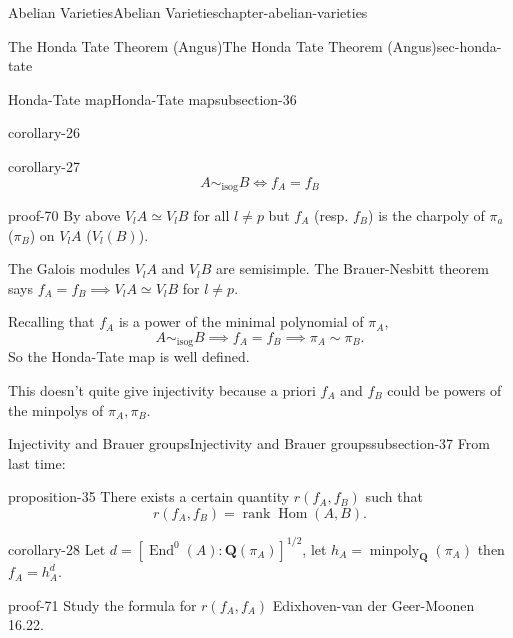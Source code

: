 \documentclass[oneside,10pt,]{book}
\numberwithin{equation}{section}
\newcommand{\lb}{[}
\newcommand{\rb}{]}
\newcommand{\QQ}{\mathbf{Q}}
\DeclareMathOperator{\End}{End}
\DeclareMathOperator{\Hom}{Hom}
\DeclareMathOperator{\rank}{rank}
\begin{document}
\begin{chapterptx}{Abelian Varieties}{}{Abelian Varieties}{}{}{chapter-abelian-varieties}
\begin{sectionptx}{The Honda Tate Theorem (Angus)}{}{The Honda Tate Theorem (Angus)}{}{}{sec-honda-tate}
\begin{subsectionptx}{Honda-Tate map}{}{Honda-Tate map}{}{}{subsection-36}
\begin{corollary}{}{}{corollary-26}
%
\end{corollary}
\begin{corollary}{}{}{corollary-27}%
\hypertarget{p-411}{}%
%
\begin{equation*}
A\sim_{\text{isog}} B \iff f_A = f_B
\end{equation*}
%
\end{corollary}
\begin{proofptx}{}{proof-70}
\hypertarget{p-412}{}%
By above \(V_l A \simeq V_lB\) for all \(l \ne p\) but \(f_A\) (resp. \(f_B\)) is the charpoly of \(\pi_a\) (\(\pi_B\)) on \(V_l A\) (\(V_l(B)\)).%
\par
\hypertarget{p-413}{}%
The Galois modules \(V_lA\) and \(V_l B\) are semisimple. The Brauer-Nesbitt theorem says \(f_A = f_B \implies V_lA \simeq V_lB \) for \(l\ne p\).%
\end{proofptx}
\hypertarget{p-414}{}%
Recalling that \(f_A\) is a power of the minimal polynomial of \(\pi_A\),%
\begin{equation*}
A \sim_{\text{isog}} B\implies  f_A =f_B \implies \pi_A \sim \pi_B\text{.}
\end{equation*}
So the Honda-Tate map is well defined.%
\par
\hypertarget{p-415}{}%
This doesn't quite give injectivity because a priori \(f_A\) and \(f_B\) could be powers of the minpolys of \(\pi_A, \pi_B\).%
\end{subsectionptx}
%
%
\typeout{************************************************}
\typeout{************************************************}
%
\begin{subsectionptx}{Injectivity and Brauer groups}{}{Injectivity and Brauer groups}{}{}{subsection-37}
\hypertarget{p-416}{}%
From last time:%
\begin{proposition}{}{}{proposition-35}%
\hypertarget{p-417}{}%
There exists a certain quantity \(r(f_A, f_B)\) such that%
\begin{equation*}
r(f_A, f_B) = \rank \Hom(A,B)\text{.}
\end{equation*}
%
\end{proposition}
\begin{corollary}{}{}{corollary-28}%
\hypertarget{p-418}{}%
Let \(d = \lb \End^0(A) : \QQ(\pi_A) \rb^{1/2}\), let \(h_A = \operatorname{minpoly}_\QQ(\pi_A)\) then \(f_A = h_A^d\).%
\end{corollary}
\begin{proofptx}{}{proof-71}
\hypertarget{p-419}{}%
Study the formula for \(r(f_A, f_A)\) Edixhoven-van der Geer-Moonen 16.22.%

\end{proofptx}
\end{subsectionptx}
\end{sectionptx}
\end{chapterptx}
\end{document}
